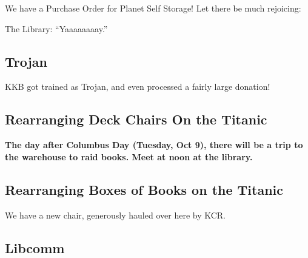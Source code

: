 \documentclass[10pt]{article}
\begin{document}
We have a Purchase Order for Planet Self Storage!  Let there be much rejoicing:

The Library:  ``Yaaaaaaaay.''

\subsection*{Trojan}

KKB got trained as Trojan, and even processed a fairly large donation!






\subsection*{Rearranging Deck Chairs On the Titanic}

\textbf{The day after Columbus Day (Tuesday, Oct 9), there will be a trip to the warehouse to raid books.  Meet at noon at the library.}

\subsection*{Rearranging Boxes of Books on the Titanic}

We have a new chair, generously hauled over here by KCR.

\subsection*{Libcomm}
\end{document}
